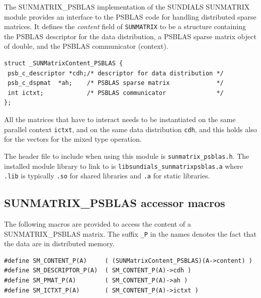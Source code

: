 \documentclass[twoside,a4paper]{refart}
\theoremstyle{definition}
\begin{document}
The SUNMATRIX\_PSBLAS implementation of the SUNDIALS SUNMATRIX module provides an interface to the PSBLAS code for handling distributed sparse matrices.
It defines the \emph{content} field of \texttt{SUNMATRIX} to be a structure containing the PSBLAS descriptor for the data distribution, a PSBLAS sparse matrix object of double, and the PSBLAS communicator (context).

\begin{lstlisting}[style=CStyle]
struct _SUNMatrixContent_PSBLAS {
 psb_c_descriptor *cdh;/* descriptor for data distribution */
 psb_c_dspmat  *ah;    /* PSBLAS sparse matrix             */
 int ictxt;            /* PSBLAS communicator              */
};
\end{lstlisting}

\attention All the matrices that have to interact needs to be instantiated on the same parallel context \lstinline[style=CStyle]|ictxt|, and on the same data distribution \lstinline[style=CStyle]|cdh|, and this holds also for the vectors for the mixed type operation.


The header file to include when using this module is \texttt{sunmatrix\_psblas.h}. The installed module library to link to is \texttt{libsundials\_sunmatrixpsblas.a} where \texttt{.lib} is typically \texttt{.so} for shared libraries and \texttt{.a} for static libraries.

\subsection{SUNMATRIX\_PSBLAS accessor macros}

The following macros are provided to access the content of a SUNMATRIX\_PSBLAS matrix. The suffix \texttt{\_P} in the names denotes the fact that the data are in distributed memory.

\begin{lstlisting}[style=CStyle]
#define SM_CONTENT_P(A)     ( (SUNMatrixContent_PSBLAS)(A->content) )
#define SM_DESCRIPTOR_P(A)  ( SM_CONTENT_P(A)->cdh )
#define SM_PMAT_P(A)        ( SM_CONTENT_P(A)->ah )
#define SM_ICTXT_P(A)       ( SM_CONTENT_P(A)->ictxt )
\end{lstlisting}
\end{document}
